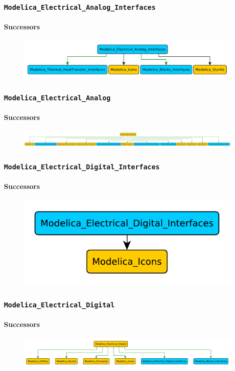 \documentclass[aspectratio=1610]{beamer}
\begin{document}
\begin{frame}
  \frametitle{\texttt{Modelica\_Electrical\_Analog\_Interfaces}}
  \framesubtitle{Successors}
  \begin{figure}
      \includegraphics[width=\textwidth]{Modelica_Electrical_Analog_Interfaces}
  \end{figure}
\end{frame}

\begin{frame}
  \frametitle{\texttt{Modelica\_Electrical\_Analog}}
  \framesubtitle{Successors}
  \begin{figure}
      \includegraphics[width=\textwidth]{Modelica_Electrical_Analog}
  \end{figure}
\end{frame}

\begin{frame}
  \frametitle{\texttt{Modelica\_Electrical\_Digital\_Interfaces}}
  \framesubtitle{Successors}
  \begin{figure}
      \includegraphics[width=\textwidth]{Modelica_Electrical_Digital_Interfaces}
  \end{figure}
\end{frame}

\begin{frame}
  \frametitle{\texttt{Modelica\_Electrical\_Digital}}
  \framesubtitle{Successors}
  \begin{figure}
      \includegraphics[width=\textwidth]{Modelica_Electrical_Digital}
  \end{figure}
\end{frame}
\end{document}
